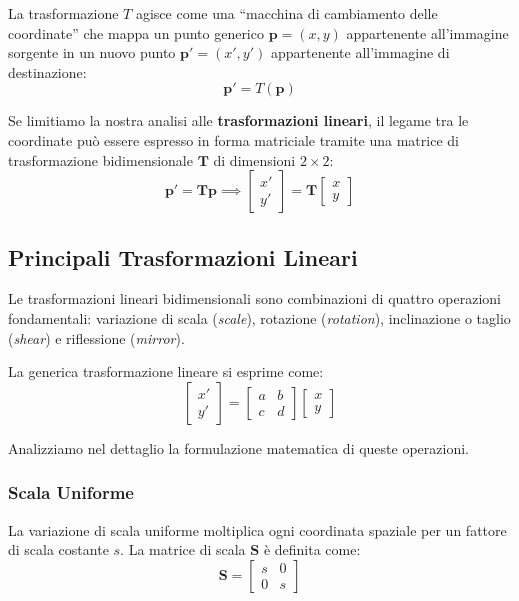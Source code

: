 ﻿\documentclass[11pt, a4paper]{article}
\begin{document}
La trasformazione $T$ agisce come una ``macchina di cambiamento delle coordinate'' che mappa un punto generico $\bm{p} = (x, y)$ appartenente all'immagine sorgente in un nuovo punto $\bm{p}' = (x', y')$ appartenente all'immagine di destinazione:
\[
\bm{p}' = T(\bm{p})
\]


Se limitiamo la nostra analisi alle \textbf{trasformazioni lineari}, il legame tra le coordinate può essere espresso in forma matriciale tramite una matrice di trasformazione bidimensionale $\bm{T}$ di dimensioni $2 \times 2$:
\[
\bm{p}' = \bm{T}\bm{p} \implies \begin{bmatrix} x' \\ y' \end{bmatrix} = \bm{T} \begin{bmatrix} x \\ y \end{bmatrix}
\]

\subsection{Principali Trasformazioni Lineari}

Le trasformazioni lineari bidimensionali sono combinazioni di quattro operazioni fondamentali: variazione di scala (\emph{scale}), rotazione (\emph{rotation}), inclinazione o taglio (\emph{shear}) e riflessione (\emph{mirror}).

La generica trasformazione lineare si esprime come:
\[
\begin{bmatrix} x' \\ y' \end{bmatrix} = \begin{bmatrix} a & b \\ c & d \end{bmatrix} \begin{bmatrix} x \\ y \end{bmatrix}
\]

Analizziamo nel dettaglio la formulazione matematica di queste operazioni.

\subsubsection{Scala Uniforme}
La variazione di scala uniforme moltiplica ogni coordinata spaziale per un fattore di scala costante $s$. La matrice di scala $\bm{S}$ è definita come:
\[
\bm{S} = \begin{bmatrix} s & 0 \\ 0 & s \end{bmatrix}
\]
\end{document}
